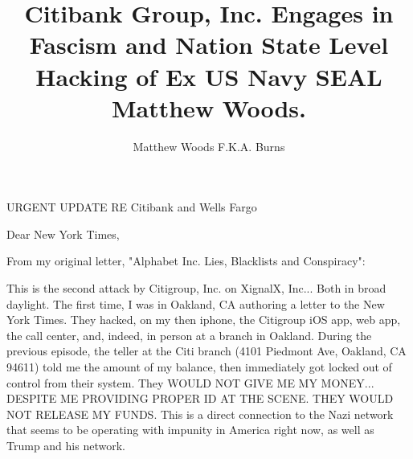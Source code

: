 \documentclass[a4paper]{arthur-letter}
\title{Citibank Group, Inc. Engages in Fascism and Nation State Level Hacking of Ex US Navy SEAL Matthew Woods.}
\author{Matthew Woods F.K.A. Burns}
\begin{document}
    \makeprofile %
    
    \address{Matthew Woods,\\PO Box 376\\Mountain View, CA, 94042}

    \begin{letter}

    \subject{TLDR: I'm a former Navy SEAL, smeared by Dianna Cowern (AKA Physics Girl) via Alphabet Inc. while working as a Google employee. From 2015-2020, I have experienced severe police misconduct first hand. This is across five counties: San Diego, Orange, Santa Clara, Oahu and Hawaii. I think they may have ties to THE Nazis, since my entire immediate family (Donald Burns, Anne Burns and Susan Burns) are Nazis... the type that agree with Adolf Hitler and Eichmann of WWII. They lied to me about this since I was born. Target Corporation, local strip malls and police succumb to fascism and try to suppress me in all ways. on top of that, Citigroup Inc. and Wells Fargo launch denial of service attacks to me and XignalX Inc: a struggling startup owned by disabled former US Navy SEALs in Hawaii. Nation state level hacking is apparent.
}
            
    URGENT UPDATE RE Citibank and Wells Fargo
            
    \opening{Dear New York Times,}
            
    From my original letter, "Alphabet Inc. Lies, Blacklists and Conspiracy":

    This is the second attack by Citigroup, Inc. on XignalX, Inc... Both in broad daylight. The first time, I was in Oakland, CA authoring a letter to the New York Times. They hacked, on my then iphone, the Citigroup iOS app, web app, the call center, and, indeed, in person at a branch in Oakland. During the previous episode, the teller at the Citi branch (4101 Piedmont Ave, Oakland, CA 94611) told me the amount of my balance, then immediately got locked out of control from their system. They WOULD NOT GIVE ME MY MONEY... DESPITE ME PROVIDING PROPER ID AT THE SCENE. THEY WOULD NOT RELEASE MY FUNDS. This is a direct connection to the Nazi network that seems to be operating with impunity in America right now, as well as Trump and his network.


\end{letter}
\end{document}
